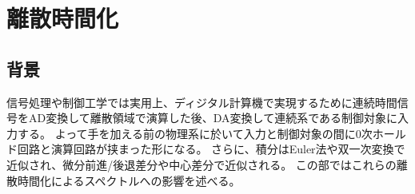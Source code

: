 \part{離散時間化}
    \chapter{背景}
        信号処理や制御工学では実用上、ディジタル計算機で実現するために連続時間信号をAD変換して離散領域で演算した後、DA変換して連続系である制御対象に入力する。
        よって手を加える前の物理系に於いて入力と制御対象の間に0次ホールド回路と演算回路が挟まった形になる。
        さらに、積分はEuler法や双一次変換で近似され、微分前進/後退差分や中心差分で近似される。
        この部ではこれらの離散時間化によるスペクトルへの影響を述べる。
    
    
